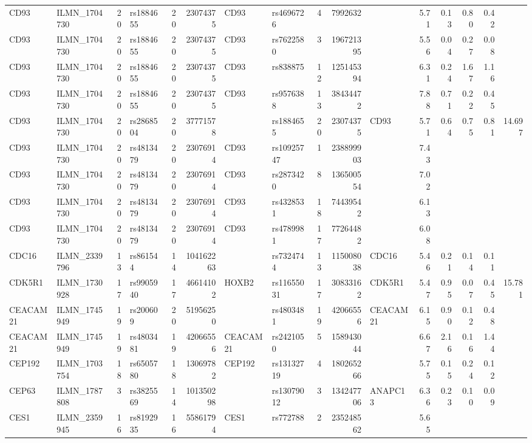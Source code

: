 \documentclass{article}
\begin{document}
\begin{landscape}
{\begin{ThreePartTable}
\begin{longtable}{|llr|lrrl|lrrl|rrrr|r|}
  CD93 & ILMN\_1704730 & 20 & rs1884655 & 20 & 23074375 & CD93 & rs4696726 & 4 & 7992632 &  & 5.71 & 0.13 & 0.80 & 0.42 &  \\
  CD93 & ILMN\_1704730 & 20 & rs1884655 & 20 & 23074375 & CD93 & rs7622580 & 3 & 196721395 &  & 5.56 & 0.04 & 0.27 & 0.08 &  \\
  CD93 & ILMN\_1704730 & 20 & rs1884655 & 20 & 23074375 & CD93 & rs838875 & 12 & 125145394 &  & 6.31 & 0.24 & 1.67 & 1.16 &  \\
  CD93 & ILMN\_1704730 & 20 & rs1884655 & 20 & 23074375 & CD93 & rs9576388 & 13 & 38434472 &  & 7.88 & 0.71 & 0.22 & 0.45 &  \\
  CD93 & ILMN\_1704730 & 20 & rs2868504 & 20 & 37771578 &  & rs1884655 & 20 & 23074375 & CD93 & 5.71 & 0.64 & 0.75 & 0.81 & 14.697 \\
  CD93 & ILMN\_1704730 & 20 & rs4813479 & 20 & 23076914 & CD93 & rs10925747 & 1 & 238899903 &  & 7.43 &  &  &  &  \\
  CD93 & ILMN\_1704730 & 20 & rs4813479 & 20 & 23076914 & CD93 & rs2873420 & 8 & 136500554 &  & 7.02 &  &  &  &  \\
  CD93 & ILMN\_1704730 & 20 & rs4813479 & 20 & 23076914 & CD93 & rs4328531 & 18 & 74439542 &  & 6.13 &  &  &  &  \\
  CD93 & ILMN\_1704730 & 20 & rs4813479 & 20 & 23076914 & CD93 & rs4789981 & 17 & 77264482 &  & 6.08 &  &  &  &  \\
  CDC16 & ILMN\_2339796 & 13 & rs861544 & 14 & 104162263 &  & rs7324744 & 13 & 115008038 & CDC16 & 5.46 & 0.21 & 0.14 & 0.11 &  \\
  CDK5R1 & ILMN\_1730928 & 17 & rs9905940 & 17 & 46614102 & HOXB2 & rs11655031 & 17 & 30833162 & CDK5R1 & 5.47 & 0.95 & 0.07 & 0.45 & 15.781 \\
  CEACAM21 & ILMN\_1745949 & 19 & rs200609 & 20 & 51956250 &  & rs4803481 & 19 & 42066556 & CEACAM21 & 6.15 & 0.90 & 0.12 & 0.48 &  \\
  CEACAM21 & ILMN\_1745949 & 19 & rs4803481 & 19 & 42066556 & CEACAM21 & rs2421050 & 5 & 158943044 &  & 6.67 & 2.16 & 0.16 & 1.44 &  \\
  CEP192 & ILMN\_1703754 & 18 & rs6505780 & 18 & 13069782 & CEP192 & rs13132719 & 4 & 180265266 &  & 5.75 & 0.15 & 0.24 & 0.12 &  \\
  CEP63 & ILMN\_1787808 & 3 & rs3825569 & 14 & 101350298 &  & rs13079012 & 3 & 134247706 & ANAPC13 & 6.36 & 0.23 & 0.10 & 0.09 &  \\
  CES1 & ILMN\_2359945 & 16 & rs8192935 & 16 & 55861794 & CES1 & rs772788 & 2 & 235248562 &  & 5.65 &  &  &  &  \\

\end{longtable}
\end{ThreePartTable}}
\end{landscape}
\end{document}
